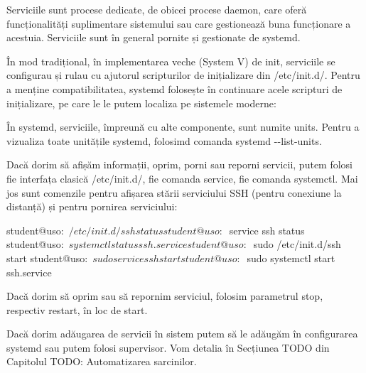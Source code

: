 Serviciile sunt procese dedicate, de obicei procese daemon, care oferă
funcționalități suplimentare sistemului sau care gestionează buna funcționare a
acestuia. Serviciile sunt în general pornite și gestionate de systemd.

În mod tradițional, în implementarea veche (System V) de init, serviciile se
configurau și rulau cu ajutorul scripturilor de inițializare din /etc/init.d/.
Pentru a menține compatibilitatea, systemd folosește în continuare acele
scripturi de inițializare, pe care le le putem localiza pe sistemele moderne:


În systemd, serviciile, împreună cu alte componente, sunt numite units. Pentru a
vizualiza toate unitățile systemd, folosimd comanda systemd -{}-list-units.

Dacă dorim să afișăm informații, oprim, porni sau reporni servicii, putem folosi
fie interfața clasică /etc/init.d/, fie comanda service, fie comanda systemctl.
Mai jos sunt comenzile pentru afișarea stării serviciului SSH (pentru conexiune
la distanță) și pentru pornirea serviciului:

\begin{screen}
student@uso:~$ /etc/init.d/ssh status
student@uso:~$ service ssh status
student@uso:~$ systemctl status ssh.service
student@uso:~$ sudo /etc/init.d/ssh start
student@uso:~$ sudo service ssh start
student@uso:~$ sudo systemctl start ssh.service
\end{screen}

Dacă dorim să oprim sau să repornim serviciul, folosim parametrul stop,
respectiv restart, în loc de start.

Dacă dorim adăugarea de servicii în sistem putem să le adăugăm în configurarea
systemd sau putem folosi supervisor. Vom detalia în Secțiunea TODO din Capitolul
TODO: Automatizarea sarcinilor.


